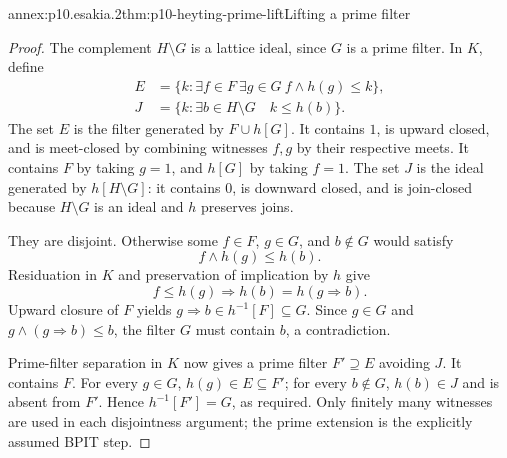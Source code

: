 \begin{annexitem}{annex:p10.esakia.2}{thm:p10-heyting-prime-lift}{Lifting a prime filter}
\begin{proof}
The complement \(H\setminus G\) is a lattice ideal, since \(G\)
is a prime filter.
In \(K\), define
\[
\begin{aligned}
 E&=\{k:\exists f\in F\ \exists g\in G\
                              f\wedge h(g)\leq k\},\\
 J&=\{k:\exists b\in H\setminus G\quad k\leq h(b)\}.
\end{aligned}
\]
The set \(E\) is the filter generated by \(F\cup h[G]\).
It contains \(1\), is upward closed, and is meet-closed by
combining witnesses \(f,g\) by their respective meets.
It contains \(F\) by taking \(g=1\), and \(h[G]\) by taking \(f=1\).
The set \(J\) is the ideal generated by \(h[H\setminus G]\):
it contains \(0\), is downward closed, and is join-closed
because \(H\setminus G\) is an ideal and \(h\) preserves joins.

They are disjoint.
Otherwise some \(f\in F\), \(g\in G\), and \(b\notin G\)
would satisfy
\[
 f\wedge h(g)\leq h(b).
\]
Residuation in \(K\) and preservation of implication by \(h\) give
\[
 f\leq h(g)\Rightarrow h(b)=h(g\Rightarrow b).
\]
Upward closure of \(F\) yields
\(g\Rightarrow b\in h^{-1}[F]\subseteq G\).
Since \(g\in G\) and \(g\wedge(g\Rightarrow b)\leq b\),
the filter \(G\) must contain \(b\), a contradiction.

Prime-filter separation in \(K\) now gives a prime filter
\(F'\supseteq E\) avoiding \(J\).
It contains \(F\).
For every \(g\in G\), \(h(g)\in E\subseteq F'\);
for every \(b\notin G\), \(h(b)\in J\) and is absent from \(F'\).
Hence \(h^{-1}[F']=G\), as required.
Only finitely many witnesses are used in each disjointness
argument; the prime extension is the explicitly assumed BPIT step.
\end{proof}
\end{annexitem}

